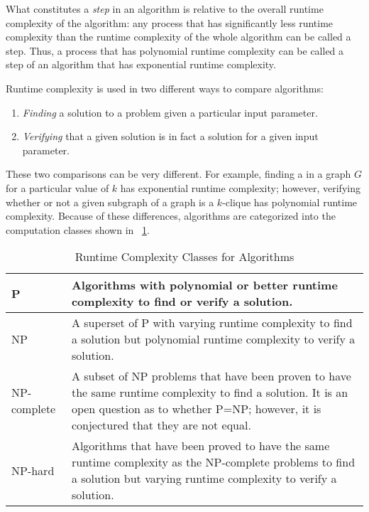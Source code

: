What constitutes a \emph{step} in an algorithm is relative to the overall runtime complexity of the algorithm: any
process that has significantly less runtime complexity than the runtime complexity of the whole algorithm can be
called a step.  Thus, a process that has polynomial runtime complexity can be called a step of an algorithm that
has exponential runtime complexity.

Runtime complexity is used in two different ways to compare algorithms:
\begin{enumerate}
\item \emph{Finding} a solution to a problem given a particular input parameter.
\item \emph{Verifying} that a given solution is in fact a solution for a given input parameter.
\end{enumerate}

These two comparisons can be very different.  For example, finding a  in a graph \(G\) for a particular
value of \(k\) has exponential runtime complexity; however, verifying whether or not a given subgraph of a graph is
a \(k\)-clique has polynomial runtime complexity.  Because of these differences, algorithms are categorized into
the computation classes shown in \tablename~\ref{tab:classes}.

\begin{table}[H]
  \centering
  \caption{Runtime Complexity Classes for Algorithms}
  \label{tab:classes}
  \setlength{\extrarowheight}{2ex}
  \begin{tabular}{|m{1in}|m{3in}|}
    \hline
    P & Algorithms with polynomial or better runtime complexity to find or verify a solution. \\
    \hline
    NP & A superset of P with varying runtime complexity to find a solution but polynomial runtime complexity to
    verify a solution. \\
    \hline
    NP-complete & A subset of NP problems that have been proven to have the same runtime complexity to find a
    solution.  It is an open question as to whether P=NP; however, it is conjectured that they are not equal. \\
    \hline
    NP-hard & Algorithms that have been proved to have the same runtime complexity as the NP-complete problems to
    find a solution but varying runtime complexity to verify a solution. \\
    \hline
  \end{tabular}
\end{table}

